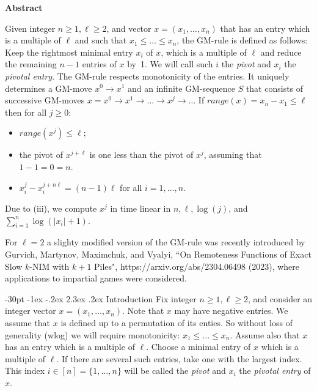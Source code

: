 \documentclass[10pt]{article}
\makeatletter
\renewcommand\section{\@startsection {section}{1}{\z@}
{-30pt \@plus -1ex \@minus -.2ex}
{2.3ex \@plus.2ex}
{\normalfont\normalsize\bfseries\boldmath}}
\theoremstyle{definition}
\makeatother
\begin{document}
\centerline{\bf Abstract}
\noindent
Given integer $n \geq 1, \ell \geq 2$, 
and vector $x = (x_1, \ldots, x_n)$  
that has an entry which is a multiple of $\ell$ and 
such that $x_1 \leq \ldots \leq x_n$,   
the GM-rule is defined as follows: 
Keep the rightmost 
minimal entry  $x_i$ of $x$, which is a multiple of $\ell$ 
and reduce the remaining $n-1$ entries of $x$ by~1. 
We will call such %
$i$  the {\em pivot} 
and $x_i$  the {\em pivotal entry}. 
The GM-rule respects monotonicity of the entries. 
It uniquely determines a GM-move $x^0 \to x^1$  and 
an infinite GM-sequence $S$ that consists 
of successive GM-moves $x = x^0 \to x^1 \to \ldots \to x^j \to \ldots$     
If $range(x) = x_n - x_1 \leq \ell$ then for all $j \geq 0$:
\begin{itemize}
\item[(i)]  $range(x^j) \leq \ell$;    
\item[(ii)] the pivot of  $x^{j + \ell}$  is one less than 
the pivot of  $x^j$, assuming that $1 - 1 = 0 = n$. 
\item[(iii)] %
$x_i^j  - x_i^{j + n \ell} = (n-1) \ell$   
for all  $i = 1,\ldots,n$. %
\end{itemize}
Due to  (iii), we compute  $x^j$  
in time linear in  
$n, \ell, \log(j)$, and $\sum^n_{i=1}\log(|x_i|+1)$. 

For $\ell = 2$  a slighty modified version 
of the GM-rule was recently introduced by 
Gurvich, Martynov, Maximchuk, and Vyalyi,  
``On Remoteness Functions of 
\newline 
Exact Slow $k$-NIM with $k+1$ Piles",  
https://arxiv.org/abs/2304.06498 (2023), 
where applications to impartial games were considered. 


\section{Introduction} 
\label{s0}
Fix integer $n \geq 1, \ell \geq 2$, 
and consider an integer vector $x = (x_1, \ldots, x_n)$. Note that $x$ may have negative entries.  
We assume that $x$ is defined 
up to a permutation of its enties. 
So without loss of generality (wlog) 
we will require monotonicity:  
$x_1 \leq \ldots \leq x_n$. 
Assume also that  $x$  has an entry which is a multiple of $\ell$. 
Choose a minimal entry of $x$  
which is a multiple of $\ell$. 
If there are several such entries,  
take one with the largest index. 
This index  $i \in [n] = \{1,\ldots,n\}$  
will be called the {\em pivot} 
and $x_i$ the {\em pivotal entry} of $x$. 
\end{document}

